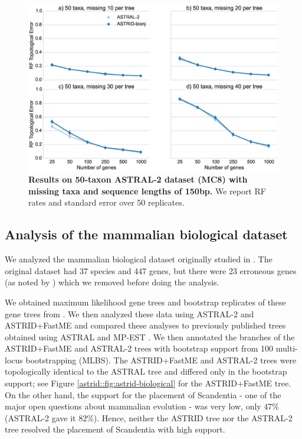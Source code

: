 \begin{figure}
  \centering
  \includegraphics[width=12cm]{astrid-figs/astral2-missing.eps}
  \caption[Results on 50-taxon ASTRAL-2 dataset with
missing  taxa ]{\textbf{Results on 50-taxon ASTRAL-2 dataset (MC8) with
missing  taxa 
    and sequence lengths of 150bp.} We
    report RF rates and standard error over 50 replicates. 
}
  \label{astrid::fig:astral2-missing}
\end{figure}



\subsection{Analysis of the mammalian biological dataset}
We analyzed the mammalian biological dataset originally
studied in \cite{song2012resolving}.  
The original
dataset had 37 species and 447 genes, but
there were 23
erroneous genes (as noted by \cite{statbinning}) which
we removed before doing the analysis. 

We obtained maximum likelihood gene trees and bootstrap
replicates of these gene trees from \cite{mirarab2014statistical}.
We then analyzed these
data using ASTRAL-2 and ASTRID+FastME
and compared these analyses to 
previously published trees obtained using ASTRAL
and MP-EST \cite{ASTRAL}. 
We then annotated the branches of the ASTRID+FastME and ASTRAL-2 trees with
bootstrap support from 100 multi-locus bootstrapping (MLBS).
The ASTRID+FastME and ASTRAL-2 trees
were topologically identical to the ASTRAL tree and differed
only in the bootstrap support;  
see Figure \ref{astrid::fig:astrid-biological} for the ASTRID+FastME tree.
On the other hand, the support for
the placement of Scandentia - one of the major
open questions about mammalian evolution - was very low,
only 47\% (ASTRAL-2 gave it 82\%). 
Hence, neither the ASTRID tree nor the ASTRAL-2 tree
resolved the placement of Scandentia
with high support.


